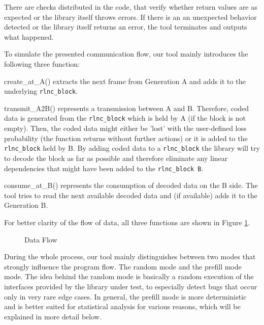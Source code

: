 \documentclass[a4paper,english,10pt]{tumarticle}
\begin{document}
There are checks distributed in the code, that verify whether return values are as expected or 
the library itself throws errors. If there is an an unexpected behavior detected or the library itself returns an error, 
the tool terminates and outputs what happened.

To simulate the presented communication flow, our tool mainly introduces the following three function:

create\_at\_A() extracts the next frame from Generation A and adds it to the underlying \texttt{rlnc\_block}. 

transmit\_A2B() represents a transmission between A and B. Therefore, coded data is generated from the 
\texttt{rlnc\_block} which is held by A (if the block is not empty). Then, the coded data might either be 'lost' 
with the user-defined loss probability (the function returns without further actions)
or it is added to the \texttt{rlnc\_block} held by B. By adding coded data to a \texttt{rlnc\_block} the library will try to decode the block as far as possible
and therefore eliminate any linear dependencies that might have been added to the \texttt{rlnc\_block B}.

consume\_at\_B() represents the consumption of decoded data on the B side. 
The tool tries to read the next available decoded data and (if available) adds it to the Generation B.

For better clarity of the flow of data, all three functions are shown in Figure \ref{fig:func}.

\begin{figure}[h]
  \center
  \caption{Data Flow}
  \label{fig:func}
\end{figure}

During the whole process, our tool mainly distinguishes between two modes that strongly influence the program flow. 
The random mode and the prefill mode mode. 
The idea behind the random mode is basically a random execution of the interfaces provided by the library under test, 
to especially detect bugs that occur only in very rare edge cases.
In general, the prefill mode is more deterministic and is better suited for 
statistical analysis for various reasons, which will be explained in more detail below.
\end{document}
